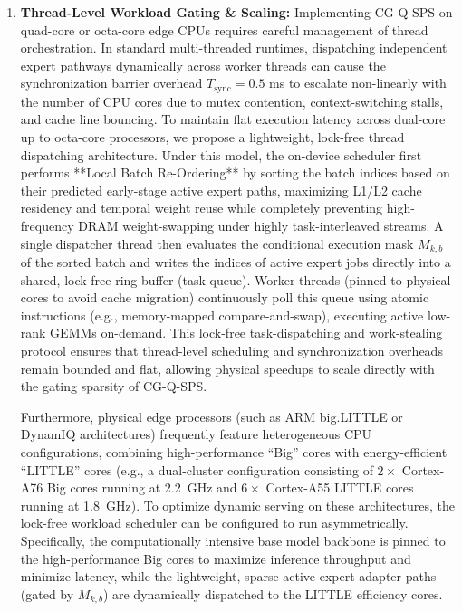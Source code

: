 \begin{enumerate}
  \item \textbf{Thread-Level Workload Gating \& Scaling:} Implementing CG-Q-SPS on quad-core or octa-core edge CPUs requires careful management of thread orchestration. In standard multi-threaded runtimes, dispatching independent expert pathways dynamically across worker threads can cause the synchronization barrier overhead $T_{\text{sync}} = 0.5$ ms to escalate non-linearly with the number of CPU cores due to mutex contention, context-switching stalls, and cache line bouncing. To maintain flat execution latency across dual-core up to octa-core processors, we propose a lightweight, lock-free thread dispatching architecture. Under this model, the on-device scheduler first performs **Local Batch Re-Ordering** by sorting the batch indices based on their predicted early-stage active expert paths, maximizing L1/L2 cache residency and temporal weight reuse while completely preventing high-frequency DRAM weight-swapping under highly task-interleaved streams. A single dispatcher thread then evaluates the conditional execution mask $M_{k, b}$ of the sorted batch and writes the indices of active expert jobs directly into a shared, lock-free ring buffer (task queue). Worker threads (pinned to physical cores to avoid cache migration) continuously poll this queue using atomic instructions (e.g., memory-mapped compare-and-swap), executing active low-rank GEMMs on-demand. This lock-free task-dispatching and work-stealing protocol ensures that thread-level scheduling and synchronization overheads remain bounded and flat, allowing physical speedups to scale directly with the gating sparsity of CG-Q-SPS.

  Furthermore, physical edge processors (such as ARM big.LITTLE or DynamIQ architectures) frequently feature heterogeneous CPU configurations, combining high-performance ``Big'' cores with energy-efficient ``LITTLE'' cores (e.g., a dual-cluster configuration consisting of $2\times$ Cortex-A76 Big cores running at 2.2~GHz and $6\times$ Cortex-A55 LITTLE cores running at 1.8~GHz). To optimize dynamic serving on these architectures, the lock-free workload scheduler can be configured to run asymmetrically. Specifically, the computationally intensive base model backbone is pinned to the high-performance Big cores to maximize inference throughput and minimize latency, while the lightweight, sparse active expert adapter paths (gated by $M_{k, b}$) are dynamically dispatched to the LITTLE efficiency cores. 


\end{enumerate}
